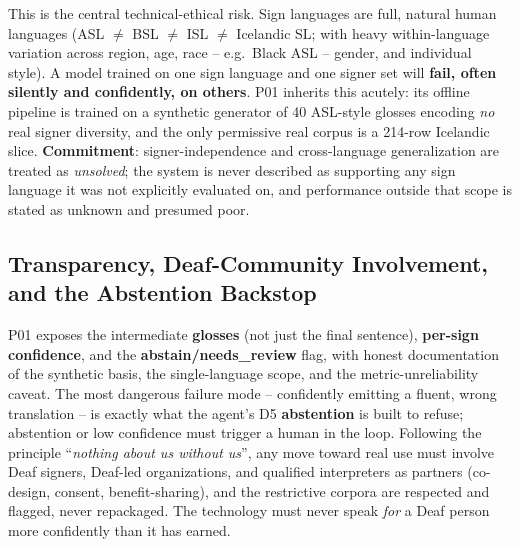 \documentclass[12pt,a4paper]{article}
\begin{document}
This is the central technical-ethical risk. Sign languages are full, natural human languages (ASL $\neq$ BSL $\neq$ ISL $\neq$ Icelandic SL; with heavy within-language variation across region, age, race -- e.g.\ Black ASL -- gender, and individual style). A model trained on one sign language and one signer set will \textbf{fail, often silently and confidently, on others}. P01 inherits this acutely: its offline pipeline is trained on a synthetic generator of 40 ASL-style glosses encoding \emph{no} real signer diversity, and the only permissive real corpus is a 214-row Icelandic slice. \textbf{Commitment}: signer-independence and cross-language generalization are treated as \emph{unsolved}; the system is never described as supporting any sign language it was not explicitly evaluated on, and performance outside that scope is stated as unknown and presumed poor.

\subsection{Transparency, Deaf-Community Involvement, and the Abstention Backstop}

P01 exposes the intermediate \textbf{glosses} (not just the final sentence), \textbf{per-sign confidence}, and the \textbf{abstain/needs\_review} flag, with honest documentation of the synthetic basis, the single-language scope, and the metric-unreliability caveat. The most dangerous failure mode -- confidently emitting a fluent, wrong translation -- is exactly what the agent's D5 \textbf{abstention} is built to refuse; abstention or low confidence must trigger a human in the loop. Following the principle ``\emph{nothing about us without us}'', any move toward real use must involve Deaf signers, Deaf-led organizations, and qualified interpreters as partners (co-design, consent, benefit-sharing), and the restrictive corpora are respected and flagged, never repackaged. The technology must never speak \emph{for} a Deaf person more confidently than it has earned.
\end{document}
